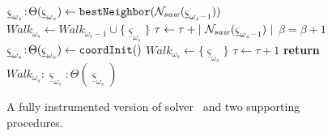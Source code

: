 \begin{figure*}[t!]
\begin{minipage}[t]{0.49\linewidth}
\begin{algorithmic}[1]
        \STATE ${\underline \varsigma}_{\omega_{s}}\!:\!\Theta({\underline \varsigma}_{\omega_{s}}) \gets {\tt bestNeighbor}({\cal N}_{saw} ({\underline \varsigma}_{\omega_{s} -1}))$
        \STATE $Walk_{\omega_{s}} \gets Walk_{\omega_{s}-1} \cup \{{\underline \varsigma}_{\omega_{s}}\}$
        \STATE $\tau \gets \tau + |~{\cal N}_{saw} ({\underline \varsigma}_{\omega_{s} -1})~| $ 
        \STATE $\beta = \beta + 1$ 
        \STATE ${\underline \varsigma}_{\omega_{s}}\!:\!\Theta({\underline \varsigma}_{\omega_{s}}) \gets {\tt coordInit}()$ 
        \STATE $Walk_{\omega_{s}} \gets \{ {\underline \varsigma}_{\omega_{s}} \}$
        \STATE $\tau \gets \tau + 1 $ 
    \ENDIF
\STATE \textbf{return} $Walk_{\omega_{s}}\!:\!{\underline \varsigma}_{\omega_{s}}\!:\!\Theta({\underline \varsigma}_{\omega_{s}})$ 
\ENDPROCEDURE 
\end{algorithmic}
\end{minipage}
\caption[Figure file: fg-global-search2.tex]{A fully instrumented version of solver \lssOrel\  and two supporting procedures.} 
\label{fg-global-search2}
\vspace*{-1ex}
\end{figure*}
